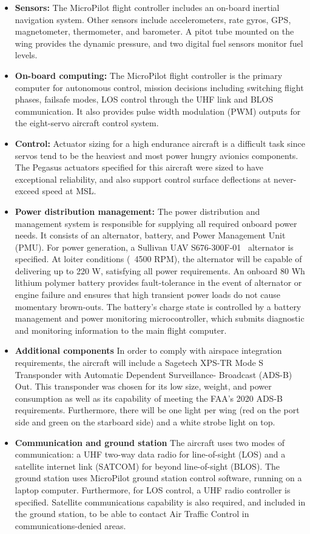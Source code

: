 \documentclass[journal]{aiaa-tc}%
\begin{document}
\begin{itemize}
    \item \textbf{Sensors: } The MicroPilot flight controller includes an on-board inertial navigation system. Other sensors include accelerometers, rate gyros, GPS, magnetometer, thermometer, and barometer. A pitot tube mounted on the wing provides the dynamic pressure, and two digital fuel sensors monitor fuel levels. 
    \item \textbf{On-board computing: } The MicroPilot flight controller is the primary computer for autonomous control, mission decisions including switching flight phases, failsafe modes, LOS control through the UHF link and BLOS communication. It also provides pulse width modulation (PWM) outputs for the eight-servo aircraft control system. 
    \item \textbf{Control: } Actuator sizing for a high endurance aircraft is a difficult task since servos tend to be the heaviest and most power hungry avionics components. The Pegasus actuators specified for this aircraft were sized to have exceptional reliability, and also support control surface deflections at never-exceed speed at MSL. 
    \item \textbf{Power distribution  management: } The power distribution and management system is responsible for supplying all required onboard power needs. It consists of an alternator, battery, and Power Management Unit (PMU). For power generation, a Sullivan UAV S676-300F-01~\cite{sullivan} alternator is specified. At loiter conditions (~4500 RPM), the alternator will be capable of delivering up to 220 W, satisfying all power requirements. An onboard 80 Wh lithium polymer battery provides fault-tolerance in the event of alternator or engine failure and ensures that high transient power loads do not cause momentary brown-outs. The battery's charge state is controlled by a battery management and power monitoring microcontroller, which submits diagnostic and monitoring information to the main flight computer.
    \item \textbf{Additional components} In order to comply with airspace integration requirements, the aircraft will include a Sagetech XPS-TR Mode S Transponder with Automatic Dependent Surveillance- Broadcast (ADS-B) Out. This transponder was chosen for its low size, weight, and power consumption as well as its capability of meeting the FAA's 2020 ADS-B requirements. Furthermore, there will be one light per wing (red on the port side and green on the starboard side) and a white strobe light on top.
    \item \textbf{Communication and ground station}
    The aircraft uses two modes of communication: a UHF two-way data radio for line-of-sight (LOS) and a satellite internet link (SATCOM) for beyond line-of-sight (BLOS). The ground station uses MicroPilot ground station control software, running on a laptop computer. Furthermore, for LOS control, a UHF radio controller is specified. Satellite communications capability is also required, and included in the ground station, to be able to contact Air Traffic Control in communications-denied areas. 
\end{itemize}
\end{document}

